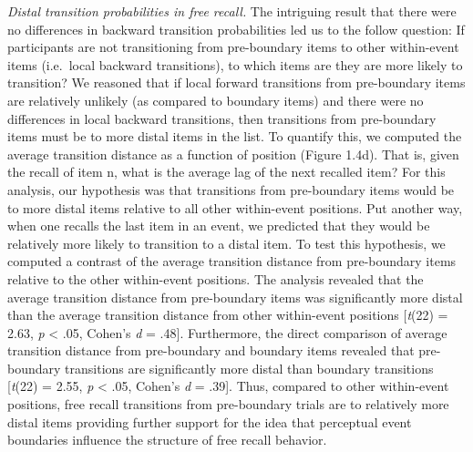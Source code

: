 \emph{Distal transition probabilities in free recall.} The intriguing
result that there were no differences in backward transition
probabilities led us to the follow question: If participants are not
transitioning from pre-boundary items to other within-event items
(i.e.~local backward transitions), to which items are they are more
likely to transition? We reasoned that if local forward transitions from
pre-boundary items are relatively unlikely (as compared to boundary
items) and there were no differences in local backward transitions, then
transitions from pre-boundary items must be to more distal items in the
list. To quantify this, we computed the average transition distance as a
function of position (Figure 1.4d). That is, given the recall of item n,
what is the average lag of the next recalled item? For this analysis,
our hypothesis was that transitions from pre-boundary items would be to
more distal items relative to all other within-event positions. Put
another way, when one recalls the last item in an event, we predicted
that they would be relatively more likely to transition to a distal
item. To test this hypothesis, we computed a contrast of the average
transition distance from pre-boundary items relative to the other
within-event positions. The analysis revealed that the average
transition distance from pre-boundary items was significantly more
distal than the average transition distance from other within-event
positions {[}\emph{t}(22) = 2.63, \emph{p} \textless{} .05, Cohen's
\emph{d} = .48{]}. Furthermore, the direct comparison of average
transition distance from pre-boundary and boundary items revealed that
pre-boundary transitions are significantly more distal than boundary
transitions {[}\emph{t}(22) = 2.55, \emph{p} \textless{} .05, Cohen's
\emph{d} = .39{]}. Thus, compared to other within-event positions, free
recall transitions from pre-boundary trials are to relatively more
distal items providing further support for the idea that perceptual
event boundaries influence the structure of free recall behavior.

